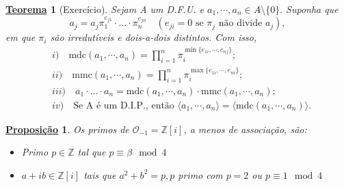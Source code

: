 \documentclass{article}
\newtheorem*{theorem*}{\underline{Teorema}}
\newtheorem*{prop*}{\underline{Proposi\c c\~ao}}
\begin{document}
\begin{theorem*}[Exercício]
  Sejam A um D.F.U. e \(a_{1}, \cdots, a_{n}\in A\setminus{\{0\}}.\) Suponha que 
  \[
    a_{j} = a_{j}\pi_{1}^{e_{j1}}\cdot\dotsc \cdot \pi_{n}^{e_{jn}} \quad (e_{ji} = 0 \text{ se } \pi_{j} \text{ não divide } a_{j}),
  \]
  em que \(\pi_{i}\) são irredutíveis e dois-a-dois distintos. Com isso, 
  \begin{align*}
    &i)\quad\mathrm{mdc}(a_{1},\cdots,a_{n}) = \prod\limits_{i=1}^{n}\pi_{i}^{\min\{e_{1i}, \cdots, e_{nj}\}};\\
    &ii)\quad \mathrm{mmc}(a_{1}, \cdots, a_{n}) = \prod\limits_{i=1}^{n}\pi_{i}^{\max\{e_{1i}, \cdots, e_{ni}\}};\\
    &iii)\quad a_{1}\cdot \dotsc \cdot  a_{n} = \mathrm{mdc}(a_{1}, \cdots, a_{n})\cdot \mathrm{mmc}(a_{1}, \cdots, a_{n});\\
    &iv)\quad \text{Se A é um D.I.P., então }  \langle a_{1}, \cdots, a_{n} \rangle = \langle \mathrm{mdc}(a_{1}, \cdots, a_{n}) \rangle.
  \end{align*}
\end{theorem*}
\begin{prop*}
  Os primos de \(\mathcal{O}_{-1} = \mathbb{Z}[i]\), a menos de associação, são:
  \begin{itemize}
    \item[1)] Primo \(p\in \mathbb{Z}\) tal que \(p\equiv \beta  \mod 4\)
    \item[2)] \(a+ib\in \mathbb{Z}[i]\) tais que \(a^{2} + b^{2} = p, p\) primo com \(p = 2\) ou \(p\equiv 1 \mod 4\)
  \end{itemize}
\end{prop*}
\end{document}
